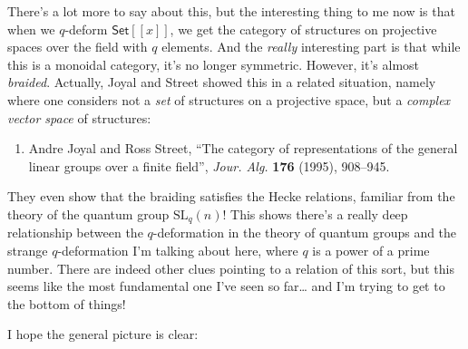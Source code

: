 \documentclass{article}
\def\tightlist{}
\begin{document}
There's a lot more to say about this, but the interesting thing to me
now is that when we \(q\)-deform \(\mathsf{Set}[[x]]\), we get the
category of structures on projective spaces over the field with \(q\)
elements. And the \emph{really} interesting part is that while this is a
monoidal category, it's no longer symmetric. However, it's almost
\emph{braided}. Actually, Joyal and Street showed this in a related
situation, namely where one considers not a \emph{set} of structures on
a projective space, but a \emph{complex vector space} of structures:

\begin{enumerate}
\def\labelenumi{\arabic{enumi})}
\setcounter{enumi}{9}
\tightlist
\item
  Andre Joyal and Ross Street, ``The category of representations of the
  general linear groups over a finite field'', \emph{Jour. Alg.}
  \textbf{176} (1995), 908--945.
\end{enumerate}

They even show that the braiding satisfies the Hecke relations, familiar
from the theory of the quantum group \(\mathrm{SL}_q(n)\)! This shows
there's a really deep relationship between the \(q\)-deformation in the
theory of quantum groups and the strange \(q\)-deformation I'm talking
about here, where \(q\) is a power of a prime number. There are indeed
other clues pointing to a relation of this sort, but this seems like the
most fundamental one I've seen so far\ldots{} and I'm trying to get to
the bottom of things!

I hope the general picture is clear:
\end{document}
